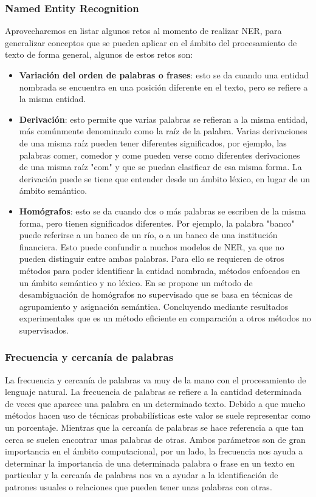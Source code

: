 \documentclass[12pt, conference]{IEEEtran}
\begin{document}
\subsubsection{Named Entity Recognition}\label{subsubsec:NER}
Aprovecharemos en listar algunos retos al momento de realizar NER, para generalizar conceptos que se pueden aplicar en el ámbito del procesamiento de texto de forma general, algunos de estos retos son: 
\begin{itemize}
  \item \textbf{Variación del orden de palabras o frases}: esto se da cuando una entidad nombrada se encuentra en una posición diferente en el texto, pero se refiere a la misma entidad.
  \item \textbf{Derivación}: esto permite que varias palabras se refieran a la misma entidad, más comúnmente denominado como la raíz de la palabra. Varias derivaciones de una misma raíz pueden tener diferentes significados, por ejemplo, las palabras comer, comedor y come pueden verse como diferentes derivaciones de una misma raíz "com" y que se puedan clasificar de esa misma forma.
  La derivación puede se tiene que entender desde un ámbito léxico, en lugar de un ámbito semántico.
  \item \textbf{Homógrafos}: esto se da cuando dos o más palabras se escriben de la misma forma, pero tienen significados diferentes. Por ejemplo, la palabra "banco" puede referirse a un banco de un río, o a un banco de una institución financiera. Esto puede confundir a muchos modelos de NER, ya que no pueden distinguir entre ambas palabras. Para ello se requieren de otros métodos para poder identificar la entidad nombrada, métodos enfocados en un ámbito semántico y no léxico. En \cite{b18} se propone un método de desambiguación de homógrafos no supervisado que se basa en técnicas de agrupamiento y asignación semántica. Concluyendo mediante resultados experimentales que es un método eficiente en comparación a otros métodos no supervisados.
\end{itemize}

\subsubsection{Frecuencia y cercanía de palabras}

La frecuencia y cercanía de palabras va muy de la mano con el procesamiento de lenguaje natural. La frecuencia de palabras se refiere a la cantidad determinada de veces que aparece una palabra en un determinado texto. 
Debido a que mucho métodos hacen uso de técnicas probabilísticas este valor se suele representar como un porcentaje. 
Mientras que la cercanía de palabras se hace referencia a que tan cerca se suelen encontrar unas palabras de otras. 
Ambos parámetros son de gran importancia en el ámbito computacional, por un lado, la frecuencia nos ayuda a determinar la importancia de una determinada palabra o frase en un texto en particular y la cercanía de palabras nos va a ayudar a la identificación de patrones usuales o relaciones que pueden tener unas palabras con otras.
\end{document}
